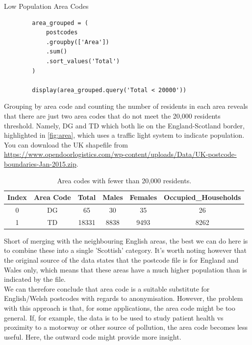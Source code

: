 \documentclass{article}
\begin{document}
\begin{mybox}[colbacktitle=green]{Low Population Area Codes}
    \begin{verbatim}    
        area_grouped = (
            postcodes
            .groupby(['Area'])
            .sum()
            .sort_values('Total')
        )

        display(area_grouped.query('Total < 20000'))
        \end{verbatim}
\end{mybox}

Grouping by area code and counting the number of residents in each area reveals that there are just two area codes that do not meet the 20,000 residents threshold. Namely, DG and TD which both lie on the England-Scotland border, highlighted in \cref{fig:area}, which uses a traffic light system to indicate population. You can download the UK shapefile from \url{https://www.opendoorlogistics.com/wp-content/uploads/Data/UK-postcode-boundaries-Jan-2015.zip}.


\begin{table}[H]
    \centering
    \caption{Area codes with fewer than 20,000 residents.}
    \label{tbl:area_codes}
    \vspace{0.5\baselineskip}

    \begin{tabular}{@{}cccccc@{}}
    \toprule
    Index   &   Area Code    & Total  & Males & Females & Occupied\_Households \\ \midrule
    0       &   DG           & 65     & 30    & 35      & 26                   \\
    1       &   TD           & 18331  & 8838  & 9493    & 8262                 \\ \bottomrule
    \end{tabular}
\end{table}

Short of merging with the neighbouring English areas, the best we can do here is to combine these into a single 'Scottish' category. It's worth noting however that the original source of the data states that the postcode file is for England and Wales only, which means that these areas have a much higher population than is indicated by the file. \\

We can therefore conclude that area code is a suitable substitute for English/Welsh postcodes with regards to anonymisation. However, the problem with this approach is that, for some applications, the area code might be too general. If, for example, the data is to be used to study patient health vs proximity to a motorway or other source of pollution, the area code becomes less useful. Here, the outward code might provide more insight. 
\end{document}
